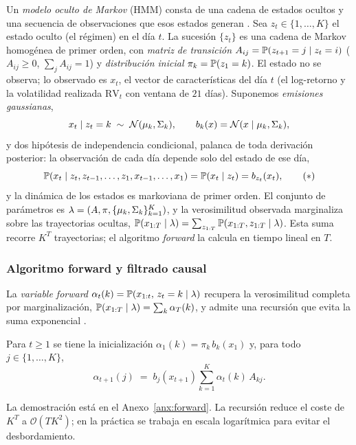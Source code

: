 Un \emph{modelo oculto de Markov} (HMM) consta de una cadena de estados ocultos y una secuencia de observaciones que esos estados generan \cite{rabiner1989, cappe2005}. Sea $z_t \in \{1, \dots, K\}$ el estado oculto (el régimen) en el día $t$. La sucesión $\{z_t\}$ es una cadena de Markov homogénea de primer orden, con \emph{matriz de transición} $A_{ij} = \mathbb{P}(z_{t+1} = j \mid z_t = i)$ ($A_{ij}\ge 0$, $\sum_j A_{ij}=1$) y \emph{distribución inicial} $\pi_k = \mathbb{P}(z_1 = k)$. El estado no se observa; lo observado es $x_t$, el vector de características del día $t$ (el log-retorno y la volatilidad realizada $\mathrm{RV}_t$ con ventana de $21$ días). Suponemos \emph{emisiones gaussianas},
\[
x_t \mid z_t = k \;\sim\; \mathcal{N}(\mu_k, \Sigma_k),
\qquad b_k(x) = \mathcal{N}(x \mid \mu_k, \Sigma_k),
\]
y dos hipótesis de independencia condicional, palanca de toda derivación posterior: la observación de cada día depende solo del estado de ese día,
\[
\mathbb{P}(x_t \mid z_t, z_{t-1}, \dots, z_1, x_{t-1}, \dots, x_1) = \mathbb{P}(x_t \mid z_t) = b_{z_t}(x_t),
\tag{$\ast$}
\]
y la dinámica de los estados es markoviana de primer orden. El conjunto de parámetros es $\lambda = (A, \pi, \{\mu_k, \Sigma_k\}_{k=1}^{K})$, y la verosimilitud observada marginaliza sobre las trayectorias ocultas, $\mathbb{P}(x_{1:T} \mid \lambda) = \sum_{z_{1:T}} \mathbb{P}(x_{1:T}, z_{1:T} \mid \lambda)$. Esta suma recorre $K^T$ trayectorias; el algoritmo \emph{forward} la calcula en tiempo lineal en $T$.

\subsubsection{Algoritmo forward y filtrado causal}
\label{sec:hmm-forward}
\label{sec:hmm-filtrado}

La \emph{variable forward} $\alpha_t(k) = \mathbb{P}(x_{1:t},\, z_t = k \mid \lambda)$ recupera la verosimilitud completa por marginalización, $\mathbb{P}(x_{1:T} \mid \lambda) = \sum_{k} \alpha_T(k)$, y admite una recursión que evita la suma exponencial \cite{rabiner1989, bishop2006}.

\begin{proposicion}
\label{prop:forward}
Para $t \ge 1$ se tiene la inicialización $\alpha_1(k) = \pi_k\, b_k(x_1)$ y, para todo $j \in \{1, \dots, K\}$,
\[
\alpha_{t+1}(j) \;=\; b_j(x_{t+1}) \sum_{k=1}^{K} \alpha_t(k)\, A_{kj}.
\]
\end{proposicion}

La demostración está en el Anexo~\ref{anx:forward}. La recursión reduce el coste de $K^T$ a $\mathcal{O}(T K^2)$; en la práctica se trabaja en escala logarítmica para evitar el desbordamiento.

